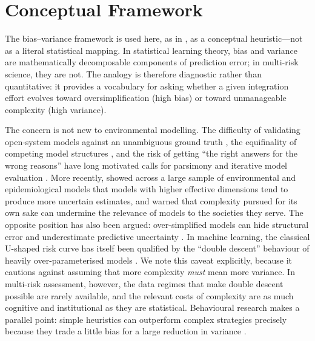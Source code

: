 \documentclass[12pt]{article}
\begin{document}
\section{Conceptual Framework}
\label{sec:framework}
The bias--variance framework is used here, as in \citet{Dunant2021}, as a conceptual heuristic---not as a literal statistical mapping. In statistical learning theory, bias and variance are mathematically decomposable components of prediction error; in multi-risk science, they are not. The analogy is therefore diagnostic rather than quantitative: it provides a vocabulary for asking whether a given integration effort evolves toward oversimplification (high bias) or toward unmanageable complexity (high variance).

The concern is not new to environmental modelling. The difficulty of validating open-system models against an unambiguous ground truth \citep{oreskes1994verification}, the equifinality of competing model structures \citep{beven2006manifesto}, and the risk of getting ``the right answers for the wrong reasons'' \citep{kirchner2006getting} have long motivated calls for parsimony and iterative model evaluation \citep{box1976science, jakeman2006ten}. More recently, \citet{puy2022models} showed across a large sample of environmental and epidemiological models that models with higher effective dimensions tend to produce more uncertain estimates, and \citet{saltelli2020five} warned that complexity pursued for its own sake can undermine the relevance of models to the societies they serve. The opposite position has also been argued: over-simplified models can hide structural error and underestimate predictive uncertainty \citep{hunt2007models}. In machine learning, the classical U-shaped risk curve has itself been qualified by the ``double descent'' behaviour of heavily over-parameterised models \citep{belkin2019reconciling}. We note this caveat explicitly, because it cautions against assuming that more complexity \textit{must} mean more variance. In multi-risk assessment, however, the data regimes that make double descent possible are rarely available, and the relevant costs of complexity are as much cognitive and institutional as they are statistical. Behavioural research makes a parallel point: simple heuristics can outperform complex strategies precisely because they trade a little bias for a large reduction in variance \citep{gigerenzer2009homo, gigerenzer2011heuristic}.
\end{document}
